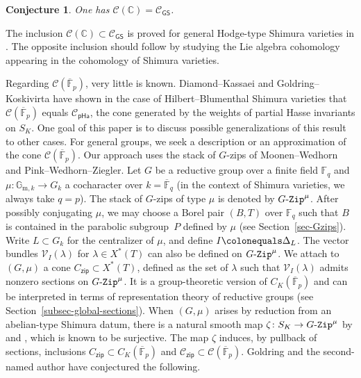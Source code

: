 \documentclass[11pt]{amsart}
\numberwithin{equation}{section}
\newtheorem{conjIntro}{Conjecture}
\theoremstyle{definition}
\theoremstyle{remark}
\newcommand{\GZip}{\mathop{\text{$G$-{\tt Zip}}}\nolimits}
\newcommand{\pha}{\mathsf{pHa}}
\newcommand{\zipsf}{\mathsf{zip}}
\newcommand{\GSsf}{\mathsf{GS}}
\newcommand{\Ccal}{{\mathcal C}}
\newcommand{\Vcal}{{\mathcal V}}
\newcommand{\CC}{\mathbb{C}}
\newcommand{\FF}{\mathbb{F}}
\newcommand{\GG}{\mathbb{G}}
\begin{document}
\begin{conjIntro}\label{conj1}
    One has $\Ccal(\CC)=\Ccal_{\GSsf}$.
\end{conjIntro}


The inclusion $\Ccal(\CC) \subset \Ccal_{\GSsf}$ is proved for general Hodge-type Shimura varieties in \cite[Theorem 2.6.4]{Goldring-Koskivirta-GS-cone}. The opposite inclusion should follow by studying the Lie algebra cohomology appearing in the cohomology of Shimura varieties.

Regarding $\Ccal(\overline{\FF}_p)$, very little is known. Diamond--Kassaei \cite{Diamond-Kassaei-comp-minimal,Diamond-Kassaei-cone-minimal} and Goldring--Koskivirta \cite{Goldring-Koskivirta-global-sections-compositio} have shown in the case of Hilbert--Blumenthal Shimura varieties that $\Ccal(\overline{\FF}_p)$ equals $\Ccal_{\pha}$, the cone generated by the weights of partial Hasse invariants on $S_K$. One goal of this paper is to discuss possible generalizations of this result to other cases. For general groups, we seek a description or an approximation of the cone $\Ccal(\overline{\FF}_p)$. Our approach uses the stack of $G$-zips of Moonen--Wedhorn and Pink--Wedhorn--Ziegler. Let $G$ be a reductive group over a finite field $\FF_q$ and $\mu\colon \GG_{\mathrm{m},k}\to G_k$ a cocharacter over $k=\overline{\FF}_q$ (in the context of Shimura varieties, we always take $q=p$). The stack of $G$-zips of type $\mu$ is denoted by $\GZip^\mu$. After possibly conjugating $\mu$, we may choose a Borel pair $(B,T)$ over $\FF_q$ such that $B$ is contained in the parabolic subgroup~$P$ defined by $\mu$ (see Section~\ref{sec-Gzips}). 
Write $L\subset G_k$ for the centralizer of $\mu$, and define $I\colonequals \Delta_L$. The vector bundles $\Vcal_I(\lambda)$ for $\lambda\in X^*(T)$ can also be defined on $\GZip^\mu$. We attach to $(G,\mu)$ a cone $C_{\zipsf}\subset X^*(T)$, defined as the set of $\lambda$ such that $\Vcal_I(\lambda)$ admits nonzero sections on $\GZip^\mu$. It is a group-theoretic version of $C_K(\overline{\FF}_p)$ and can be interpreted in terms of representation theory of reductive groups (see Section~\ref{subsec-global-sections}). When $(G,\mu)$ arises by reduction from an abelian-type Shimura datum, there is a natural smooth map $\zeta\colon S_K\to \GZip^\mu$ by \cite{Zhang-EO-Hodge} and \cite{imai-kato-youcis-prim-real}, which is known to be surjective. The map $\zeta$ induces, by pullback of sections, inclusions $C_{\zipsf}\subset C_K(\overline{\FF}_p)$ and $\Ccal_{\zipsf}\subset \Ccal(\overline{\FF}_p)$. Goldring and the second-named author have conjectured the following.  
\end{document}
